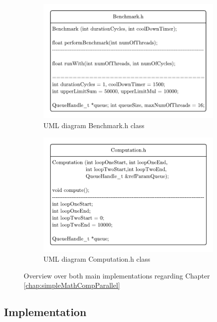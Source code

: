 \begin{figure}[htbp]
	\centering
	\begin{subfigure}{.5\textwidth}
		\centerline{\includegraphics[width=1\linewidth]{images/Benchmark-UML.pdf}}
		\caption{ UML diagram Benchmark.h class }
		\label{fig:benchUML}
	\end{subfigure}%
	\begin{subfigure}{.5\textwidth}
		\centerline{\includegraphics[width=1\linewidth]{images/Computation-UML.pdf}}
		\caption{ UML diagram Computation.h class }
		\label{fig:compUML}
	\end{subfigure}
	\caption{Overview over both main implementations regarding Chapter \ref{chap:simpleMathCompParallel}}
	\label{fig:umlDiagrBasicExample}
\end{figure}

\subsection{Implementation}

